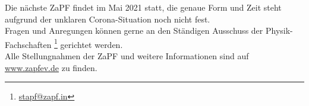 \documentclass{scrartcl}
\begin{document}
Die nächste ZaPF findet im Mai 2021 statt, die genaue Form und Zeit steht aufgrund der unklaren Corona-Situation noch nicht fest. \\
Fragen und Anregungen können gerne an den Ständigen Ausschuss der Physik-Fachschaften \footnote{\url{stapf@zapf.in}} gerichtet werden.\\
Alle Stellungnahmen der ZaPF und weitere Informationen sind auf \url{www.zapfev.de} zu finden.
\end{document}
